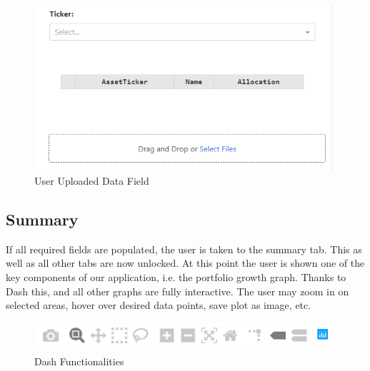 \documentclass[main.tex]{subfiles}
\begin{document}
\begin{figure}[H]

   \centering

   \includegraphics[scale=0.6]{08Appendices/081User/081Pictures/user_csv.png}

   \caption{User Uploaded Data Field}

\end{figure}



\subsection*{Summary}



If all required fields are populated, the user is taken to the summary tab. This as well as all other tabs are now unlocked. At this point the user is shown one of the key components of our application, i.e. the portfolio growth graph. Thanks to Dash this, and all other graphs are fully interactive. The user may zoom in on selected areas, hover over desired data points, save plot as image, etc.



\begin{figure}[H]

   \centering

   \includegraphics[width=\textwidth]{08Appendices/081User/081Pictures/dash_funcionalities.png}

   \caption{Dash Functionalities}

   \label{dash_functionalities}

\end{figure}
\end{document}
